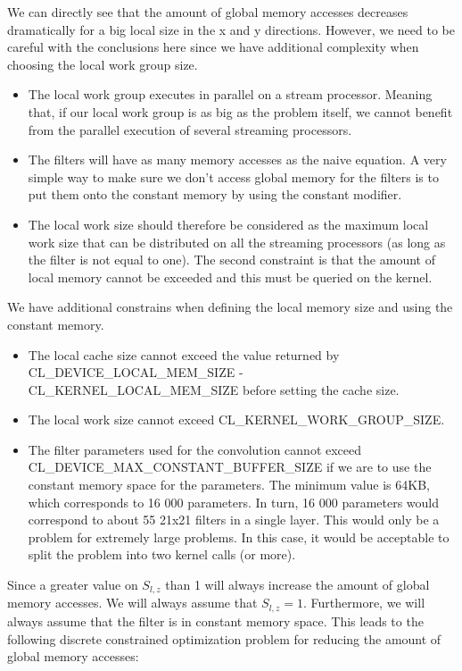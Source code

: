 \documentclass[a4paper,10pt]{article}
\theoremstyle{definition}
\begin{document}
We can directly see that the amount of global memory accesses decreases dramatically for a big local size in the x and y directions. However, we need to be careful with the conclusions here since we have additional complexity when choosing the local work group size.
\begin{itemize}
	\item The local work group executes in parallel on a stream processor. Meaning that, if our local work group is as big as the problem itself, we cannot benefit from the parallel execution of several streaming processors.
	\item The filters will have as many memory accesses as the naive equation. A very simple way to make sure we don't access global memory for the filters is to put them onto the constant memory by using the constant modifier.
	\item The local work size should therefore be considered as the maximum local work size that can be distributed on all the streaming processors (as long as the filter is not equal to one). The second constraint is that the amount of local memory cannot be exceeded and this must be queried on the kernel. 
\end{itemize}
We have additional constrains when defining the local memory size and using the constant memory.
\begin{itemize}
	\item The local cache size cannot exceed the value returned by  CL\_DEVICE\_LOCAL\_MEM\_SIZE - CL\_KERNEL\_LOCAL\_MEM\_SIZE before setting the cache size.
	\item The local work size cannot exceed CL\_KERNEL\_WORK\_GROUP\_SIZE.
	\item The filter parameters used for the convolution cannot exceed \\ CL\_DEVICE\_MAX\_CONSTANT\_BUFFER\_SIZE if we are to use the constant memory space for the parameters. The minimum value is 64KB, which corresponds to 16 000 parameters. In turn, 16 000 parameters would correspond to about 55 21x21 filters in a single layer. This would only be a problem for extremely large problems. In this case, it would be acceptable to split the problem into two kernel calls (or more).
\end{itemize}
Since a greater value on $S_{l,z}$ than 1 will always increase the amount of global memory accesses. We will always assume that $S_{l,z} = 1$. Furthermore, we will always assume that the filter is in constant memory space. This leads to the following discrete constrained optimization problem for reducing the amount of global memory accesses:
\end{document}

